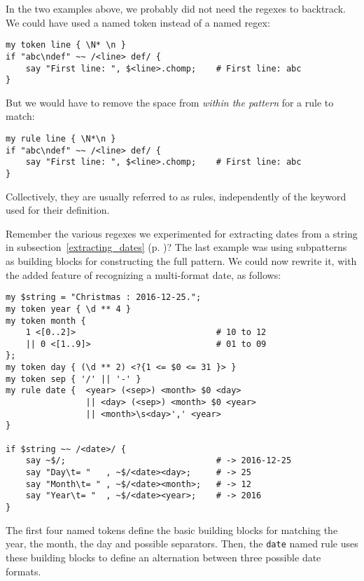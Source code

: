 In the two examples above, we probably did not need the 
regexes to backtrack. We could have used a named token 
instead of a named regex:

\begin{verbatim}
my token line { \N* \n }
if "abc\ndef" ~~ /<line> def/ {
    say "First line: ", $<line>.chomp;    # First line: abc
}
\end{verbatim} 

But we would have to remove the space from \emph{within the pattern} for a rule to match:

\begin{verbatim}
my rule line { \N*\n }
if "abc\ndef" ~~ /<line> def/ {
    say "First line: ", $<line>.chomp;    # First line: abc
}
\end{verbatim} 

Collectively, they are usually referred to as rules, 
independently of the keyword used for their definition.

Remember the various regexes we experimented for 
extracting dates from a string in 
subsection~\ref{extracting_dates} 
(p. \pageref{extracting_dates})? The last example was 
using subpatterns as building blocks for constructing 
the full pattern. We could now rewrite it, with the 
added feature of recognizing a multi-format date, as 
follows:

\begin{verbatim}
my $string = "Christmas : 2016-12-25.";                                         
my token year { \d ** 4 }                                        
my token month {   
    1 <[0..2]>                            # 10 to 12                     
    || 0 <[1..9]>                         # 01 to 09                     
};
my token day { (\d ** 2) <?{1 <= $0 <= 31 }> }  
my token sep { '/' || '-' } 
my rule date {  <year> (<sep>) <month> $0 <day> 
                || <day> (<sep>) <month> $0 <year> 
                || <month>\s<day>',' <year>
}                         

if $string ~~ /<date>/ {
    say ~$/;                              # -> 2016-12-25
    say "Day\t= "   , ~$/<date><day>;     # -> 25
    say "Month\t= " , ~$/<date><month>;   # -> 12
    say "Year\t= "  , ~$/<date><year>;    # -> 2016
}          
\end{verbatim} 

The first four named tokens define the basic building 
blocks for matching the year, the month, the day and 
possible separators. Then, the {\tt date}  
named rule uses these building blocks to define an 
alternation between three possible date formats.

